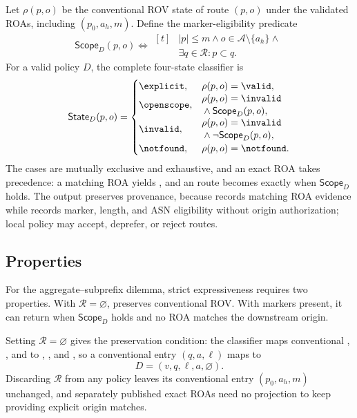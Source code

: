 Let $\rho(p,o)$ be the conventional ROV state of route $(p,o)$ under the validated ROAs, including $(p_0,a_h,m)$. Define the marker-eligibility predicate
\begin{equation}
\mathsf{Scope}_D(p,o)\iff
\begin{aligned}[t]
&|p|\leq m\land o\in\mathcal{A}\setminus\{a_h\}\land{}\\[-2pt]
&\exists q\in\mathcal{R}:p\subset q.
\end{aligned}
\end{equation}
For a valid policy $D$, the complete four-state classifier is
\begingroup
\small
\begin{equation}
\mathsf{State}_D(p,o)=
\begin{cases}
\explicit, & \rho(p,o)=\valid,\\
\openscope, &
\begin{aligned}
&\rho(p,o)=\invalid\\[-2pt]
&{}\land\mathsf{Scope}_D(p,o),
\end{aligned}\\
\invalid, &
\begin{aligned}
&\rho(p,o)=\invalid\\[-2pt]
&{}\land\neg\mathsf{Scope}_D(p,o),
\end{aligned}\\
\notfound, & \rho(p,o)=\notfound.
\end{cases}
\end{equation}
\endgroup
The cases are mutually exclusive and exhaustive, and an exact ROA takes precedence: a matching ROA yields \explicit{}, and an \invalid{} route becomes \openscope{} exactly when $\mathsf{Scope}_D$ holds. The output preserves provenance, because \explicit{} records matching ROA evidence while \openscope{} records marker, length, and ASN eligibility without origin authorization; local policy may accept, deprefer, or reject \openscope{} routes.

\subsection{Properties}

For the aggregate--subprefix dilemma, strict expressiveness requires two properties. With $\mathcal{R}=\varnothing$, \ssrov{} preserves conventional ROV. With markers present, it can return \openscope{} when $\mathsf{Scope}_D$ holds and no ROA matches the downstream origin.

Setting $\mathcal{R}=\varnothing$ gives the preservation condition: the classifier maps conventional \valid{}, \invalid{}, and \notfound{} to \explicit{}, \invalid{}, and \notfound{}, so a conventional entry $(q,a,\ell)$ maps to
\begin{equation}
D=(v,q,\ell,a,\varnothing).
\end{equation}
Discarding $\mathcal{R}$ from any policy leaves its conventional entry $(p_0,a_h,m)$ unchanged, and separately published exact ROAs need no projection to keep providing explicit origin matches.

